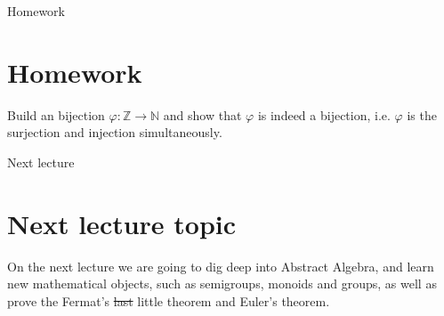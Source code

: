\documentclass{beamer}
\begin{document}
\begin{frame}{Homework}
    \section{Homework}
    Build an bijection $\varphi : \mathbb{Z} \to \mathbb{N}$ and show that $\varphi$ is indeed a bijection, i.e. 
    $\varphi$ is the surjection and injection simultaneously.
\end{frame}

\begin{frame}{Next lecture}
    \section{Next lecture topic}
    On the next lecture we are going to dig deep into Abstract Algebra, and learn new mathematical objects, such as 
    semigroups, monoids and groups, as well as prove the Fermat's \st{last} little theorem and Euler's theorem.
\end{frame}
\end{document}
